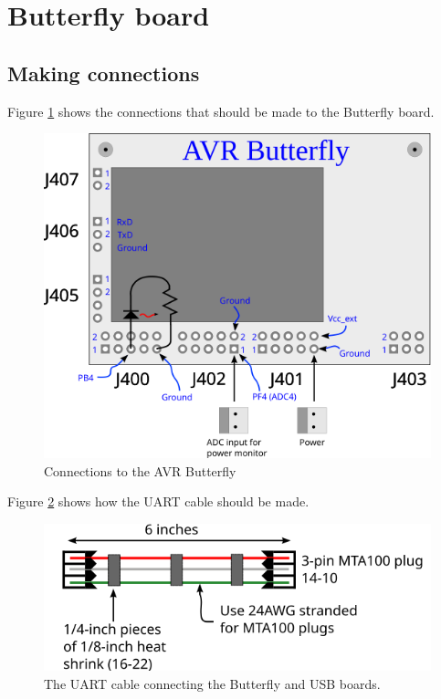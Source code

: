 \section{Butterfly board}

\subsection{Making connections}
Figure \ref{fig:bfly_connect} shows the connections that should be made to
the Butterfly board.

\begin{figure}[ht]
  \begin{center}
    \includegraphics[clip,scale=1]{figs/butterfly_connect}
    \caption{Connections to the AVR Butterfly \label{fig:bfly_connect}}
  \end{center}
\end{figure}

Figure \ref{fig:uart_cable} shows how the UART cable should be made.
\begin{figure}[ht]
  \begin{center}
    \includegraphics[clip,scale=1]{figs/uart_cable}
    \caption{The UART cable connecting the Butterfly and USB
      boards.\label{fig:uart_cable}}
  \end{center}
\end{figure}
